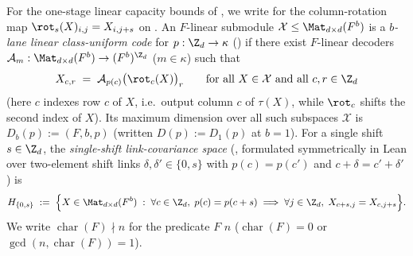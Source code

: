 For the one-stage linear capacity bounds of , we write
 for the column-rotation map $\rot_s(X)_{i,j} = X_{i, j+s}$ on
. An $F$-linear submodule
$\mathcal{X} \le \Mat_{d\times d}(F^b)$ is a \emph{$b$-lane linear class-uniform code} for
$p : \Z_d \to \kappa$ () if there exist $F$-linear decoders
$\mathcal{A}_m : \Mat_{d\times d}(F^b) \to (F^b)^{\Z_d}$ ($m \in \kappa$) such that
\[
  X_{c, r} \;=\; \mathcal{A}_{p(c)}\bigl(\rot_c(X)\bigr)_r
  \qquad
  \text{for all } X \in \mathcal{X} \text{ and all } c, r \in \Z_d
\]
(here $c$ indexes row $c$ of $X$, i.e.\ output column $c$ of $\tau(X)$, while $\rot_c$ shifts the
second index of $X$). Its maximum dimension over all such subspaces $\mathcal{X}$ is
$D_b(p) := {}$$(F, b, p)$ (written $D(p) := D_1(p)$ at $b = 1$). For a
single shift $s \in \Z_d$, the
\emph{single-shift link-covariance space} (, formulated symmetrically in
Lean over two-element shift links $\delta, \delta' \in \{0, s\}$ with $p(c) = p(c')$ and
$c + \delta = c' + \delta'$) is
\[
  H_{\{0, s\}}
  \;:=\;
  \Bigl\{X \in \Mat_{d\times d}(F^b) \;:\;
    \forall c \in \Z_d,\; p(c) = p(c + s) \implies
    \forall j \in \Z_d,\; X_{c + s, j} = X_{c, j + s}\Bigr\}.
\]
We write $\operatorname{char}(F) \nmid n$ for the predicate  $F$ $n$
($\operatorname{char}(F) = 0$ or $\gcd(n, \operatorname{char}(F)) = 1$).

